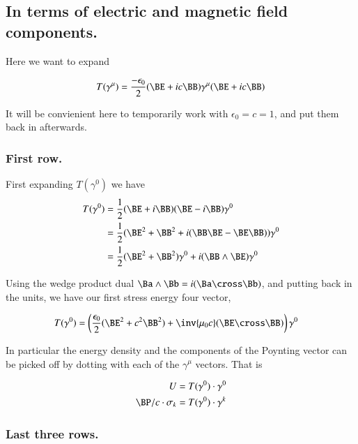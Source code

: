 \documentclass{article}
\begin{document}
\subsection{ In terms of electric and magnetic field components. }

Here we want to expand 

\begin{align*}
T(\gamma^\mu) = \frac{-\epsilon_0}{2} (\BE + i c \BB) \gamma^\mu (\BE + i c \BB)
\end{align*}

It will be convienient here to temporarily work with $\epsilon_0 = c = 1$, and put them back in afterwards.

\subsubsection{ First row. } 

First expanding $T(\gamma^0)$ we have
\begin{align*}
T(\gamma^0) 
&= \frac{1}{2} (\BE + i \BB) (\BE - i \BB) \gamma^0 \\
&= \frac{1}{2} (\BE^2 + \BB^2 + i (\BB \BE - \BE \BB)) \gamma^0 \\
&= \frac{1}{2} (\BE^2 + \BB^2) \gamma^0 + i ( \BB \wedge \BE ) \gamma^0 \\
\end{align*}

Using the wedge product dual $\Ba \wedge \Bb = i (\Ba \cross \Bb)$, and putting back in the units, we have our
first stress energy four vector, 

\begin{align}
T(\gamma^0) &= \left( \frac{\epsilon_0}{2} (\BE^2 + c^2 \BB^2) + \inv{\mu_0 c} (\BE \cross \BB) \right) \gamma^0 
\end{align}

In particular the energy density and the components of the Poynting vector can be picked off by dotting with each of the $\gamma^\mu$ vectors.  That is

\begin{align}
U                    &= T(\gamma^0) \cdot \gamma^0 \\
\BP/c \cdot \sigma_k &= T(\gamma^0) \cdot \gamma^k
\end{align}

\subsubsection{ Last three rows. }
\end{document}
